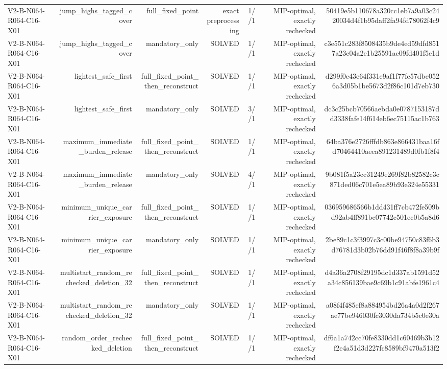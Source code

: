 {\begin{longtable}{lrrrrrr}
V2-B-N064-R064-C16-X01 & jump\_highs\_tagged\_cover & full\_fixed\_point & exact preprocessing & 1//1 & MIP-optimal, exactly rechecked & 50419e5b110678a320cc1eb7a9a03c2420034d4f1b95daff2fa94fd78062f4c9 \\
V2-B-N064-R064-C16-X01 & jump\_highs\_tagged\_cover & mandatory\_only & SOLVED & 1//1 & MIP-optimal, exactly rechecked & c3e551c283f8508435b9de4ed59dfd8517a23c04a2e1b25591ac09fd401f5e1d \\
V2-B-N064-R064-C16-X01 & lightest\_safe\_first & full\_fixed\_point\_then\_reconstruct & SOLVED & 1//1 & MIP-optimal, exactly rechecked & d299f0e43e64f331e9af1f77fe57dbe0526a3d05b1be5673d2f86c101d7eb730 \\
V2-B-N064-R064-C16-X01 & lightest\_safe\_first & mandatory\_only & SOLVED & 3//1 & MIP-optimal, exactly rechecked & dc3c25bcb70566aebda0e0787153187dd3338fafe14f614eb6ec75115ac1b763 \\
V2-B-N064-R064-C16-X01 & maximum\_immediate\_burden\_release & full\_fixed\_point\_then\_reconstruct & SOLVED & 1//1 & MIP-optimal, exactly rechecked & 64ba376e2726fffdb863e866431baa16fd70464410aeea891231489d0fb1f8f4 \\
V2-B-N064-R064-C16-X01 & maximum\_immediate\_burden\_release & mandatory\_only & SOLVED & 4//1 & MIP-optimal, exactly rechecked & 9b081f5a23cc31249e269f82b82582c3c871ded06c701e5ea89b93e324e55331 \\
V2-B-N064-R064-C16-X01 & minimum\_unique\_carrier\_exposure & full\_fixed\_point\_then\_reconstruct & SOLVED & 1//1 & MIP-optimal, exactly rechecked & 036959686566b1dd431ff7cb472fe509bd92ab4ff891bc07742c501ec0b5a8d6 \\
V2-B-N064-R064-C16-X01 & minimum\_unique\_carrier\_exposure & mandatory\_only & SOLVED & 1//1 & MIP-optimal, exactly rechecked & 2be89c1c3f3997c3c00be94750c83f6b3d76781d3b02b76dd91f46f8f8a39b9f \\
V2-B-N064-R064-C16-X01 & multistart\_random\_rechecked\_deletion\_32 & full\_fixed\_point\_then\_reconstruct & SOLVED & 1//1 & MIP-optimal, exactly rechecked & d4a36a2708f29195dc1d337ab1591d52a34c856139bae9c69b1c91abfe1961c4 \\
V2-B-N064-R064-C16-X01 & multistart\_random\_rechecked\_deletion\_32 & mandatory\_only & SOLVED & 1//1 & MIP-optimal, exactly rechecked & a08f4f485ef8a884954bd26a4a0d2f267ae77be946030fc3030da734b5c0e30a \\
V2-B-N064-R064-C16-X01 & random\_order\_rechecked\_deletion & full\_fixed\_point\_then\_reconstruct & SOLVED & 1//1 & MIP-optimal, exactly rechecked & df6a1a742cc70fe8330dd1c60469b3b12f2e4a51d3d227fc8589bf9470a513f2 \\

\end{longtable}}
